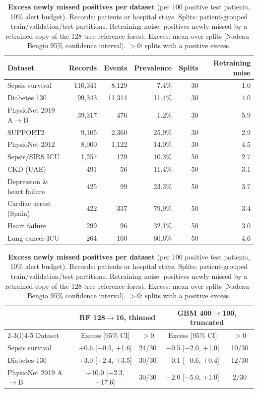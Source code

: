 \begin{table}[!htb]
\centering
\caption{\textbf{Excess newly missed positives per dataset} (per 100 positive test patients, 10\% alert budget). Records: patients or hospital stays. Splits: patient-grouped train/validation/test partitions. Retraining noise: positives newly missed by a retrained copy of the 128-tree reference forest. Excess: mean over splits [Nadeau--Bengio 95\% confidence interval]. $>0$: splits with a positive excess.}
\label{tab:PER-DATASET}
{\small
\begin{tabular}{lrrrrr}
\toprule
Dataset & Records & Events & Prevalence & Splits & Retraining noise \\
\midrule
Sepsis survival & 110{,}341 & 8{,}129 & 7.4\% & 30 & 1.0 \\
Diabetes 130 & 99{,}343 & 11{,}314 & 11.4\% & 30 & 4.0 \\
PhysioNet 2019 A$\rightarrow$B & 39{,}317 & 476 & 1.2\% & 30 & 5.9 \\
SUPPORT2 & 9{,}105 & 2{,}360 & 25.9\% & 30 & 2.9 \\
PhysioNet 2012 & 8{,}000 & 1{,}122 & 14.0\% & 30 & 4.5 \\
Sepsis/SIRS ICU & 1{,}257 & 129 & 10.3\% & 50 & 2.7 \\
CKD (UAE) & 491 & 56 & 11.4\% & 50 & 3.1 \\
Depression \& heart failure & 425 & 99 & 23.3\% & 50 & 3.7 \\
Cardiac arrest (Spain) & 422 & 337 & 79.9\% & 50 & 3.4 \\
Heart failure & 299 & 96 & 32.1\% & 50 & 3.0 \\
Lung cancer ICU & 264 & 160 & 60.6\% & 50 & 4.6 \\
\bottomrule
\end{tabular}
\par\vspace{1.2em}
\begin{tabular}{lcccc}
\toprule
 & \multicolumn{2}{c}{RF 128$\rightarrow$16, thinned} & \multicolumn{2}{c}{GBM 400$\rightarrow$100, truncated} \\
\cmidrule(lr){2-3}\cmidrule(l){4-5}
Dataset & Excess [95\% CI] & $>0$ & Excess [95\% CI] & $>0$ \\
\midrule
Sepsis survival & +0.6 [$-$0.5, +1.6] & 24/30 & $-$0.5 [$-$2.0, +1.0] & 10/30 \\
Diabetes 130 & +3.0 [+2.4, +3.5] & 30/30 & $-$0.1 [$-$0.6, +0.4] & 12/30 \\
PhysioNet 2019 A$\rightarrow$B & +10.0 [+2.3, +17.6] & 30/30 & $-$2.0 [$-$5.0, +1.0] & 2/30 \\

\end{tabular}}
\end{table}
